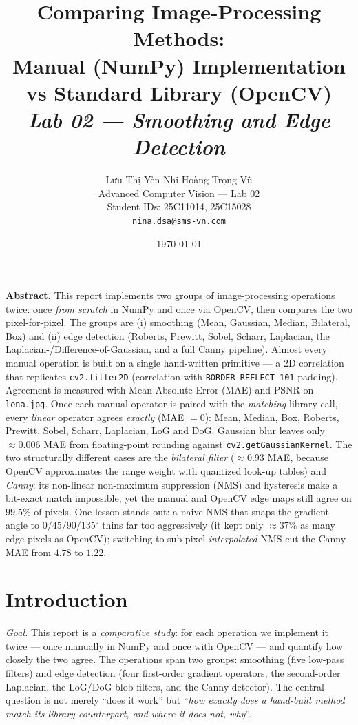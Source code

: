 \documentclass[a4paper,11pt]{article}
\title{\vspace{-1.2cm}\textbf{\large Comparing Image-Processing Methods:}\\[2pt]
\textbf{\large Manual (NumPy) Implementation vs Standard Library (OpenCV)}\\[3pt]
\normalsize\textit{Lab 02 --- Smoothing and Edge Detection}}
\author{
\normalsize Lưu Thị Yến Nhi \quad\quad Hoàng Trọng Vũ\\[2pt]
\normalsize Advanced Computer Vision --- Lab 02\\
\normalsize Student IDs: 25C11014, 25C15028\\
\normalsize \texttt{nina.dsa@sms-vn.com}
}
\date{\today}
\newcommand{\runin}[1]{\par\medskip\noindent\textit{#1}\hspace{0.4em}\ignorespaces}
\begin{document}
\maketitle

\noindent\textbf{Abstract.}\hspace{0.4em}
This report implements two groups of image-processing operations twice: once
\emph{from scratch} in NumPy and once via OpenCV, then compares the two
pixel-for-pixel. The groups are (i) smoothing (Mean, Gaussian, Median, Bilateral,
Box) and (ii) edge detection (Roberts, Prewitt, Sobel, Scharr, Laplacian, the
Laplacian-/Difference-of-Gaussian, and a full Canny pipeline). Almost every manual
operation is built on a single hand-written primitive --- a 2D correlation that
replicates \texttt{cv2.filter2D} (correlation with \texttt{BORDER\_REFLECT\_101}
padding). Agreement is measured with Mean Absolute Error (MAE) and PSNR on
\texttt{lena.jpg}. Once each manual operator is paired with the \emph{matching}
library call, every \emph{linear} operator agrees \emph{exactly} (MAE $=0$): Mean,
Median, Box, Roberts, Prewitt, Sobel, Scharr, Laplacian, LoG and DoG. Gaussian blur
leaves only $\approx0.006$ MAE from floating-point rounding against
\texttt{cv2.getGaussianKernel}. The two structurally different cases are the
\emph{bilateral filter} ($\approx0.93$ MAE, because OpenCV approximates the range
weight with quantized look-up tables) and \emph{Canny}: its non-linear non-maximum
suppression (NMS) and hysteresis make a bit-exact match impossible, yet the manual
and OpenCV edge maps still agree on $99.5\%$ of pixels. One lesson stands out: a
naive NMS that snaps the gradient angle to $0/45/90/135^\circ$ thins far too
aggressively (it kept only $\approx37\%$ as many edge pixels as OpenCV); switching
to sub-pixel \emph{interpolated} NMS cut the Canny MAE from $4.78$ to $1.22$.

\section{Introduction}
\runin{Goal.} This report is a \emph{comparative study}: for each operation we
implement it twice --- once manually in NumPy and once with OpenCV --- and quantify
how closely the two agree. The operations span two groups: smoothing (five low-pass
filters) and edge detection (four first-order gradient operators, the second-order
Laplacian, the LoG/DoG blob filters, and the Canny detector). The central question
is not merely ``does it work'' but ``\emph{how exactly does a hand-built method match
its library counterpart, and where it does not, why}''.
\end{document}
